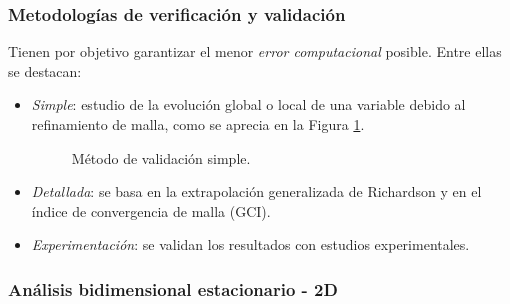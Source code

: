 \subsubsection{Metodolog\'ias de verificaci\'on y validaci\'on}

\noindent
\justify

Tienen por objetivo garantizar el menor \textit{error computacional} posible. Entre ellas se destacan:

\begin{itemize}
	\item \textit{Simple}: estudio de la evoluci\'on global o local de una variable debido al refinamiento de malla, como se aprecia en la Figura \ref{valsimple}.
	\begin{figure}[h!]
	\centering
	\caption{M\'etodo de validaci\'on simple.}
	\label{valsimple}
	\end{figure}
	\item \textit{Detallada}: se basa en la extrapolaci\'on generalizada de Richardson y en el \'indice de convergencia de malla (GCI).
	\item \textit{Experimentaci\'on}: se validan los resultados con estudios experimentales.
\end{itemize}

\subsubsection{An\'alisis bidimensional estacionario - 2D} \label{CFD2D}

\noindent
\justify

